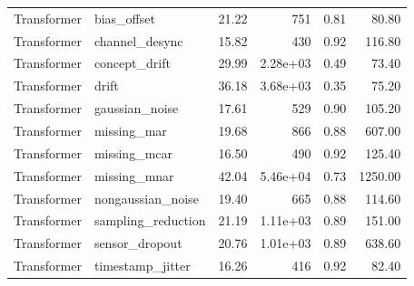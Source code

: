 \begin{table}
\begin{tabular}{llrrrr}
Transformer & bias\_offset & 21.22 & 751 & 0.81 & 80.80 \\
Transformer & channel\_desync & 15.82 & 430 & 0.92 & 116.80 \\
Transformer & concept\_drift & 29.99 & 2.28e+03 & 0.49 & 73.40 \\
Transformer & drift & 36.18 & 3.68e+03 & 0.35 & 75.20 \\
Transformer & gaussian\_noise & 17.61 & 529 & 0.90 & 105.20 \\
Transformer & missing\_mar & 19.68 & 866 & 0.88 & 607.00 \\
Transformer & missing\_mcar & 16.50 & 490 & 0.92 & 125.40 \\
Transformer & missing\_mnar & 42.04 & 5.46e+04 & 0.73 & 1250.00 \\
Transformer & nongaussian\_noise & 19.40 & 665 & 0.88 & 114.60 \\
Transformer & sampling\_reduction & 21.19 & 1.11e+03 & 0.89 & 151.00 \\
Transformer & sensor\_dropout & 20.76 & 1.01e+03 & 0.89 & 638.60 \\
Transformer & timestamp\_jitter & 16.26 & 416 & 0.92 & 82.40 \\
\bottomrule
\end{tabular}
\end{table}
